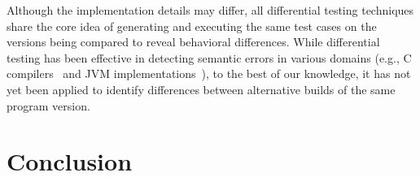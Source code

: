 \documentclass[conference]{IEEEtran}
\begin{document}
Although the implementation details may differ, all differential testing techniques share the core idea of generating and executing the same test cases on the versions being compared to reveal behavioral differences. %
While differential testing has been effective in detecting semantic errors in various domains (e.g., C compilers~\cite{Yang:compiler:pldi:2011} and JVM implementations~\cite{Chen:jvmdiff:pldi:2016}), to the best of our knowledge, it has not yet been applied to identify differences between alternative builds of the same program version.






\section{Conclusion}











\end{document}

